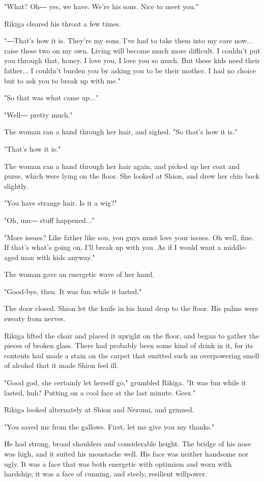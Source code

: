"What? Oh― yes, we have. We're his sons. Nice to meet you."

Rikiga cleared his throat a few times.

"―That's how it is. They're my sons. I've had to take them into my care
now... raise these two on my own. Living will become much more
difficult. I couldn't put you through that, honey. I love you, I love
you so much. But these kids need their father... I couldn't burden you
by asking you to be their mother. I had no choice but to ask you to
break up with me."

"So that was what came up..."

"Well― pretty much."

The woman ran a hand through her hair, and sighed. "So that's how it
is."

"That's how it is."

The woman ran a hand through her hair again, and picked up her coat and
purse, which were lying on the floor. She looked at Shion, and drew her
chin back slightly.

"You have strange hair. Is it a wig?"

"Oh, um― stuff happened..."

"More issues? Like father like son, you guys must love your issues. Oh
well, fine. If that's what's going on, I'll break up with you. As if I
would want a middle-aged man with kids anyway."

The woman gave an energetic wave of her hand.

"Good-bye, then. It was fun while it lasted."

The door closed. Shion let the knife in his hand drop to the floor. His
palms were sweaty from nerves.

Rikiga lifted the chair and placed it upright on the floor, and began to
gather the pieces of broken glass. There had probably been some kind of
drink in it, for its contents had made a stain on the carpet that
emitted such an overpowering smell of alcohol that it made Shion feel
ill.

"Good god, she certainly let herself go," grumbled Rikiga. "It was fun
while it lasted, huh? Putting on a cool face at the last minute. Geez."

Rikiga looked alternately at Shion and Nezumi, and grinned.

"You saved me from the gallows. First, let me give you my thanks."

He had strong, broad shoulders and considerable height. The bridge of
his nose was high, and it suited his moustache well. His face was
neither handsome nor ugly. It was a face that was both energetic with
optimism and worn with hardship; it was a face of cunning, and steely,
resilient willpower.

